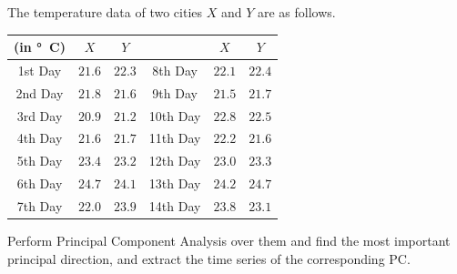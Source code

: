 \begin{exmp}
\label{exmp:tempPCA}
The temperature data of two cities $X$ and $Y$ are as follows.
\begin{center}
\begin{tabular}{|c|c|c|c|c|c|}
\hline
(in \si{\degree C}) & $X$ & $Y$ & & $X$ & $Y$ \\
\hline
1st Day & $21.6$ & $22.3$ & 8th Day & $22.1$ & $22.4$ \\
\hline
2nd Day & $21.8$ & $21.6$ & 9th Day & $21.5$ & $21.7$ \\
\hline
3rd Day & $20.9$ & $21.2$ & 10th Day & $22.8$ & $22.5$ \\
\hline
4th Day & $21.6$ & $21.7$ & 11th Day & $22.2$ & $21.6$ \\
\hline
5th Day & $23.4$ & $23.2$ & 12th Day & $23.0$ & $23.3$ \\
\hline 
6th Day & $24.7$ & $24.1$ & 13th Day & $24.2$ & $24.7$ \\
\hline 
7th Day & $22.0$ & $23.9$ & 14th Day & $23.8$ & $23.1$ \\
\hline
\end{tabular}
\end{center}
Perform Principal Component Analysis over them and find the most important principal direction, and extract the time series of the corresponding PC.
\end{exmp}
